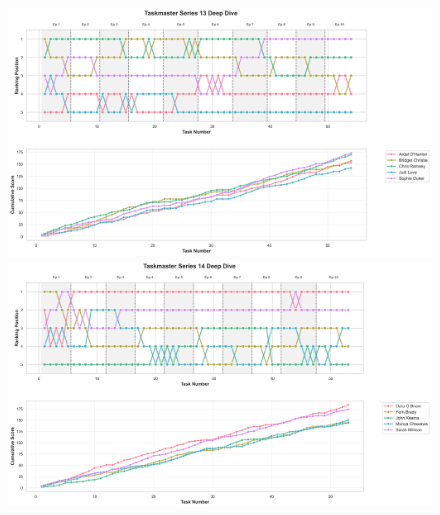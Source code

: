 \documentclass[10pt,letterpaper]{article}
\begin{document}
\begin{figure}[!h]
\centering
\includegraphics[width=\linewidth]{figures/supplementary/series_13_deep_dive.png}
\includegraphics[width=\linewidth]{figures/supplementary/series_14_deep_dive.png}
\end{figure}
\FloatBarrier
\clearpage
\end{document}
